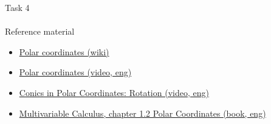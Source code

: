 \documentclass[aspectratio=169]{beamer}
\newcommand{\fbckg}[1]{\usebackgroundtemplate{\texttt{[image: \#1]}}}%
\begin{document}
\begin{frame}[t]{Task 4}
    \framesubtitle{}
\end{frame}


\begin{frame}[t]{Reference material}
    \Large
    \begin{itemize}
        \item \href{https://en.wikipedia.org/wiki/Polar_coordinate_system}{Polar coordinates (wiki)}
        \item \href{https://youtu.be/IAb98ZgSJNw}{Polar coordinates (video, eng)}
        \item \href{https://youtu.be/me3cBMfysZs}{Conics in Polar Coordinates: Rotation (video, eng)}
        \item \href{https://www.maths.tcd.ie/~stalker/22S1/MA22S1_Chapter_1.pdf}{Multivariable Calculus, chapter 1.2 Polar Coordinates (book, eng)}
    \end{itemize}
\end{frame}

\fbckg{fibeamer/figs/last_page.png}
\frame[plain]{}
\end{document}
